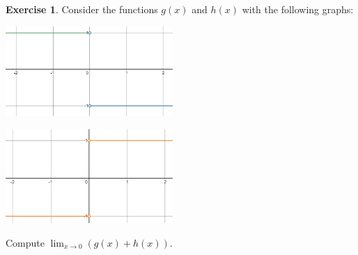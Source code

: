 \documentclass[11pt,reqno,final]{amsart}
\numberwithin{equation}{section}
\numberwithin{figure}{section}
\theoremstyle{definition} %
\newtheorem{exercise}{Exercise}
\begin{document}
\begin{exercise}
        Consider the functions $g(x)$ and $h(x)$ with the following graphs:
        
        \begin{minipage}{0.5\textwidth}
                \begin{center}
                        \includegraphics[width=2.5in]{10-07P_g.png}
                \end{center}
        \end{minipage}
        \begin{minipage}{0.5\textwidth}
                \begin{center}
                        \includegraphics[width=2.5in]{10-07P_h.png}
                \end{center}
        \end{minipage}
        
        Compute $\displaystyle\lim_{x \to 0}(g(x)+h(x))$.
        \vfill
\end{exercise}
\end{document}
